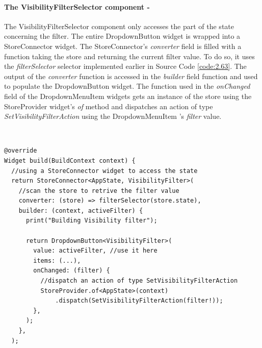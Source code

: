 \paragraph{The VisibilityFilterSelector component - }
\label{subpar:todo_app_bloc_core_state}
The VisibilityFilterSelector component only accesses the part of the state concerning the filter. The entire DropdownButton widget is wrapped into a StoreConnector widget. The StoreConnector’s \textit{converter} field  is filled with a function taking the store and returning the current filter value. To do so, it uses the \textit{filterSelector} selector implemented earlier in Source Code \ref{code:2.63}. The output of the \textit{converter} function is accessed in the \textit{builder} field function and used to populate the DropdownButton widget. The function used in the \textit{onChanged} field of the DropdownMenuItem widgets gets an instance of the store using the StoreProvider widget’s \textit{of} method and dispatches an action of type \textit{SetVisibilityFilterAction} using the DropdownMenuItem 's \textit{filter} value.
\begin{code}
\mbox{}\\
 \mbox{}
		\label{code:2.14}
\begin{verbatim}
@override
Widget build(BuildContext context) {
  //using a StoreConnector widget to access the state
  return StoreConnector<AppState, VisibilityFilter>(
    //scan the store to retrive the filter value
    converter: (store) => filterSelector(store.state),
    builder: (context, activeFilter) {
      print("Building Visibility filter");

      return DropdownButton<VisibilityFilter>(
        value: activeFilter, //use it here
        items: (...),
        onChanged: (filter) {
          //dispatch an action of type SetVisibilityFilterAction
          StoreProvider.of<AppState>(context)
              .dispatch(SetVisibilityFilterAction(filter!));
        },
      );
    },
  );
\end{verbatim}
\mbox{}
\end{code}


